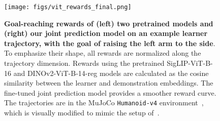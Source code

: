 \begin{figure}[h] %
    \centering
    \texttt{[image: figs/vit\_rewards\_final.png]}
    \caption{\small \textbf{Goal-reaching rewards of (left) two pretrained models and (right) our joint prediction model on an example learner trajectory, with the goal of raising the left arm to the side}. To emphasize their shape, all rewards are normalized along the trajectory dimension. Rewards using the pretrained SigLIP-ViT-B-16 \cite{zhai2023sigmoid} and DINOv2-ViT-B-14-reg \cite{oquab2023dinov2} models are calculated as the cosine similarity between the learner and demonstration embeddings. The fine-tuned joint prediction model provides a smoother reward curve. The trajectories are in the MuJoCo \texttt{Humanoid-v4} environment~\citep{mujoco,humanoidgym}, which is visually modified to mimic the setup of~\cite{rocamonde2024visionlanguage}.}
    \label{fig:vit_rewards}
\end{figure}
